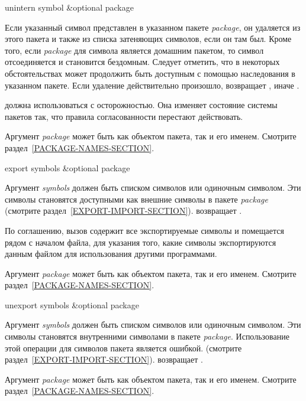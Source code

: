 \begin{defun}[Функция]
unintern symbol &optional package

Если указанный символ представлен в указанном пакете \emph{package}, он
удаляется из этого пакета и также из списка затеняющих символов, если он там
был. Кроме того, если \emph{package} для символа является домашним пакетом, то
символ отсоединяется и становится бездомным.
Следует отметить, что в некоторых обстоятельствах может продолжить быть
доступным с помощью наследования в указанном пакете.
Если удаление действительно произошло,  возвращает {\true}, иначе
{\false}.

 должна использоваться с осторожностью. Она изменяет состояние
системы пакетов так, что правила согласованности перестают действовать.

Аргумент \emph{package} может быть как объектом пакета, так и его
именем. Смотрите раздел~\ref{PACKAGE-NAMES-SECTION}.
\end{defun}

\begin{defun}[Функция]
export symbols &optional package

Аргумент \emph{symbols} должен быть списком символов или одиночным
символом. Эти символы становятся доступными как внешние символы в пакете
\emph{package} (смотрите раздел~\ref{EXPORT-IMPORT-SECTION}).
 возвращает {\true}.

По соглашению, вызов  содержит все экспортируемые символы и
помещается рядом с началом файла, для указания того, какие символы
экспортируются данным файлом для использования другими программами. 

Аргумент \emph{package} может быть как объектом пакета, так и его
именем. Смотрите раздел~\ref{PACKAGE-NAMES-SECTION}.
\end{defun}

\begin{defun}[Функция]
unexport symbols &optional package

Аргумент \emph{symbols} должен быть списком символов или одиночным символом. Эти
символы становятся внутренними символами в пакете \emph{package}. 
Использование этой операции для символов пакета  является ошибкой.
(смотрите раздел~\ref{EXPORT-IMPORT-SECTION}).
 возвращает {\true}.

Аргумент \emph{package} может быть как объектом пакета, так и его
именем. Смотрите раздел~\ref{PACKAGE-NAMES-SECTION}.
\end{defun}

